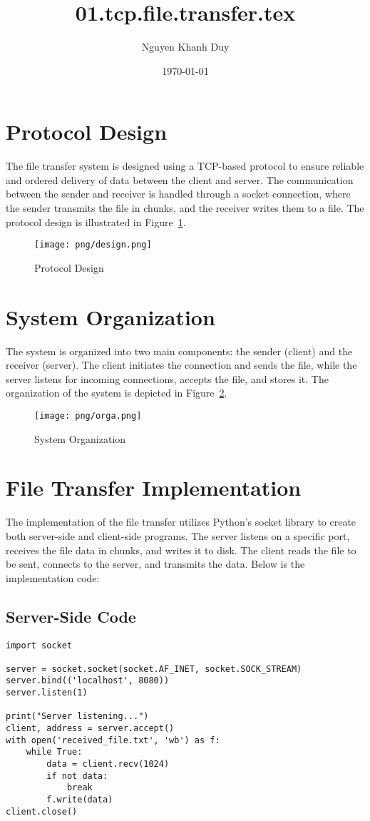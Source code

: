 \documentclass{article}
\title{01.tcp.file.transfer.tex}
\author{Nguyen Khanh Duy}
\date{\today}
\begin{document}
\maketitle

\section{Protocol Design}
The file transfer system is designed using a TCP-based protocol to ensure reliable and ordered delivery of data between the client and server. The communication between the sender and receiver is handled through a socket connection, where the sender transmits the file in chunks, and the receiver writes them to a file. The protocol design is illustrated in Figure~\ref{fig:protocol}.

\begin{figure}[h!]
    \centering
    \texttt{[image: png/design.png]} 
    \caption{Protocol Design}
    \label{fig:protocol}
\end{figure}

\section{System Organization}
The system is organized into two main components: the sender (client) and the receiver (server). The client initiates the connection and sends the file, while the server listens for incoming connections, accepts the file, and stores it. The organization of the system is depicted in Figure~\ref{fig:system}.

\begin{figure}[h!]
    \centering
    \texttt{[image: png/orga.png]} 
    \caption{System Organization}
    \label{fig:system}
\end{figure}

\section{File Transfer Implementation}
The implementation of the file transfer utilizes Python's socket library to create both server-side and client-side programs. The server listens on a specific port, receives the file data in chunks, and writes it to disk. The client reads the file to be sent, connects to the server, and transmits the data. Below is the implementation code:

\subsection{Server-Side Code}
\begin{verbatim}
import socket

server = socket.socket(socket.AF_INET, socket.SOCK_STREAM)
server.bind(('localhost', 8080))
server.listen(1)

print("Server listening...")
client, address = server.accept()
with open('received_file.txt', 'wb') as f:
    while True:
        data = client.recv(1024)
        if not data:
            break
        f.write(data)
client.close()
\end{verbatim}
\end{document}
